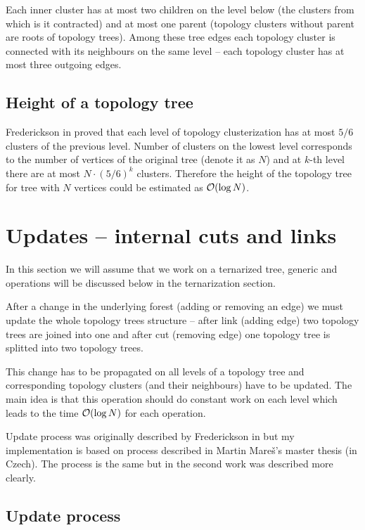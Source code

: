 Each inner cluster has at most two children on the level below (the clusters
from which is it contracted) and at most one parent (topology clusters without
parent are roots of topology trees). Among these tree edges each topology
cluster is connected with its neighbours on the same level -- each topology
cluster has at most three outgoing edges.

\subsection{Height of a topology tree}

Frederickson in \cite{DSforDynamicallyMaintainingRootedTrees} proved that each
level of topology clusterization has at most $5/6$ clusters of the previous
level. Number of clusters on the lowest level corresponds to the number of
vertices of the original tree (denote it as $N$) and at $k$-th level there are
at most $N\cdot(5/6)^k$ clusters. Therefore the height of the topology tree for
tree with $N$ vertices could be estimated as ${\cal O}(\log N)$.

\section{Updates -- internal cuts and links}

In this section we will assume that we work on a ternarized tree, generic \Cut{}
and \Link{} operations will be discussed below in the ternarization section.

After a change in the underlying forest (adding or removing an edge) we must
update the whole topology trees structure -- after {\I link} (adding edge) two
topology trees are joined into one and after {\I cut} (removing edge) one
topology tree is splitted into two topology trees.

This change has to be propagated on all levels of a topology tree and
corresponding topology clusters (and their neighbours) have to be updated. The
main idea is that this operation should do constant work on each level which
leads to the time ${\cal O}(\log N)$ for each operation.

Update process was originally described by Frederickson in
\cite{DSforDynamicallyMaintainingRootedTrees} but my implementation is based on
process described in Martin Mareš's master thesis \cite{DGA} (in Czech). The
process is the same but in the second work was described more clearly.

\subsection{Update process}

